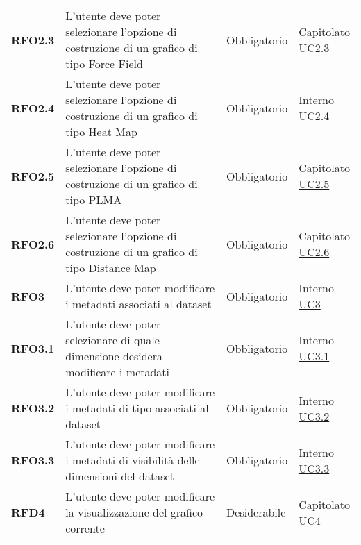 \begin{longtable}[H]{>{\raggedright\bfseries}m{20mm} >{\raggedright}m{90mm} >{\raggedright}m{28mm} >{\raggedright\arraybackslash}m{30mm}}
    RFO2.3
    & L'utente deve poter selezionare l'opzione di costruzione di un grafico di tipo Force Field
    & Obbligatorio
    & \makecell{ Capitolato \\  \hyperref[ssub:uc2.3]{UC2.3}}\\

    RFO2.4
    & L'utente deve poter selezionare l'opzione di costruzione di un grafico di tipo Heat Map
    & Obbligatorio
    & \makecell{ Interno \\  \hyperref[ssub:uc2.4]{UC2.4}}\\

    RFO2.5
    & L'utente deve poter selezionare l'opzione di costruzione di un grafico di tipo PLMA
    & Obbligatorio
    & \makecell{Capitolato \\ \hyperref[ssub:uc2.5]{UC2.5}}\\

    RFO2.6
    & L'utente deve poter selezionare l'opzione di costruzione di un grafico di tipo Distance Map
    & Obbligatorio
    & \makecell{Capitolato \\ \hyperref[ssub:uc2.6]{UC2.6}}\\

    RFO3
    & L'utente deve poter modificare i metadati associati al dataset
    & Obbligatorio
    & \makecell{ Interno \\  \hyperref[sub:uc3]{UC3} }\\

    RFO3.1
    & L'utente deve poter selezionare di quale dimensione desidera modificare i metadati
    & Obbligatorio
    & \makecell{ Interno \\\hyperref[ssub:uc3.1]{UC3.1} }\\

    RFO3.2
    & L'utente deve poter modificare i metadati di tipo associati al dataset
    & Obbligatorio
    & \makecell{ Interno \\\hyperref[ssub:uc3.2]{UC3.2} }\\

    RFO3.3
    & L'utente deve poter modificare i metadati di visibilità delle dimensioni del dataset
    & Obbligatorio
    & \makecell{ Interno \\  \hyperref[ssub:uc3.3]{UC3.3} }\\

    RFD4
    & L'utente deve poter modificare la visualizzazione del grafico corrente
    & Desiderabile
    & \makecell{ Capitolato \\ \hyperref[sub:uc4]{UC4} }\\


\end{longtable}
